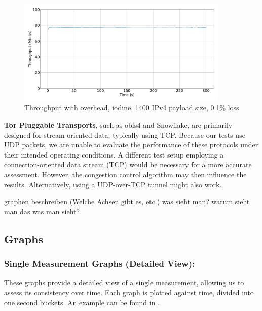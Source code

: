 \begin{figure}[tbh]
	\centering
	\includegraphics[draft=false,width=0.9\textwidth]{figures/Graphs/graph-5-iodine-constant-throughput/throughput.pdf}
	\caption{Throughput with overhead, iodine, 1400 IPv4 payload size, 0.1\% loss}
	\label{fig:graph-5-iodine-constant-throughput}
\end{figure}


\textbf{Tor Pluggable Transports}, such as obfs4 and Snowflake, are primarily designed for stream-oriented data, typically using TCP.
Because our tests use UDP packets, we are unable to evaluate the performance of these protocols under their intended operating conditions.
A different test setup employing a connection-oriented data stream (TCP) would be necessary for a more accurate assessment.
However, the congestion control algorithm may then influence the results.
Alternatively, using a UDP-over-TCP tunnel might also work.




graphen beschreiben (Welche Achsen gibt es, etc.)
was sieht man?
warum sieht man das was man sieht?

\subsection{Graphs}
\subsubsection{Single Measurement Graphs (Detailed View):}
These graphs provide a detailed view of a single measurement, allowing us to assess its consistency over time.
Each graph is plotted against time, divided into one second buckets.
An example can be found in .

